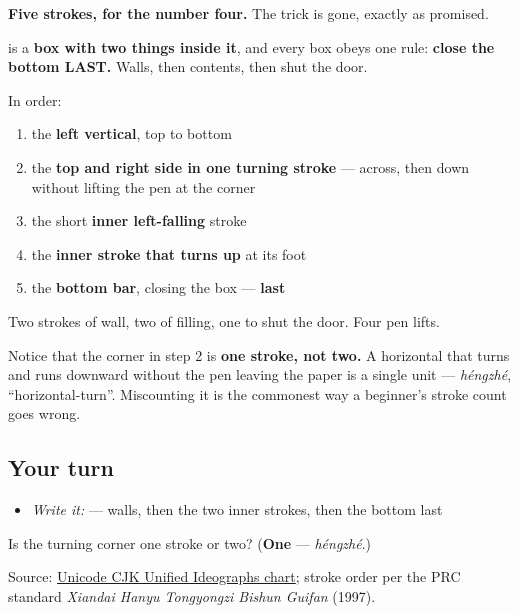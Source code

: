 \begin{quote}
\end{quote}

\textbf{Five strokes, for the number four.} The trick is gone, exactly as promised.

 is a \textbf{box with two things inside it}, and every box obeys one rule: \textbf{close the bottom LAST.} Walls, then contents, then shut the door.

In order:

\begin{enumerate}
\raggedright
  \item the \textbf{left vertical}, top to bottom
  \item the \textbf{top and right side in one turning stroke} — across, then down without lifting the pen at the corner
  \item the short \textbf{inner left-falling} stroke
  \item the \textbf{inner stroke that turns up} at its foot
  \item the \textbf{bottom bar}, closing the box — \textbf{last}
\end{enumerate}

Two strokes of wall, two of filling, one to shut the door. Four pen lifts.

Notice that the corner in step 2 is \textbf{one stroke, not two.} A horizontal that turns and runs downward without the pen leaving the paper is a single unit — \emph{héngzhé}, \textquotedblleft{}horizontal-turn\textquotedblright{}. Miscounting it is the commonest way a beginner's stroke count goes wrong.

\subsection*{Your turn}
\begin{itemize}
\raggedright
  \item \emph{Write it:}  — walls, then the two inner strokes, then the bottom last
\end{itemize}

\begin{tcolorbox}[breakable,colback=teal!4,colframe=teal!35!black,title={Before you move on}]
Is the turning corner one stroke or two? (\textbf{One} — \emph{héngzhé}.)

Source: \href{https://www.unicode.org/charts/PDF/U4E00.pdf}{Unicode CJK Unified Ideographs chart}; stroke order per the PRC standard \emph{Xiandai Hanyu Tongyongzi Bishun Guifan} (1997).
\end{tcolorbox}
